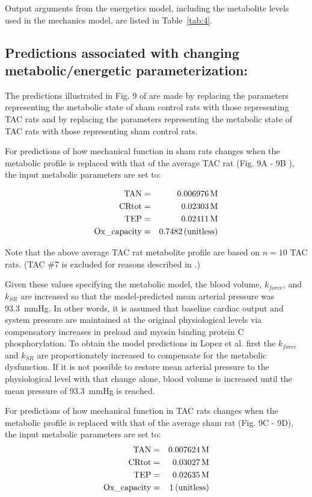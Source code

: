 \documentclass[fleqn,10pt]{physiome}
\begin{document}
Output arguments from the energetics model, including the metabolite levels used in the mechanics model, are listed in Table~\ref{tab:4}.

\subsection{Predictions associated with changing metabolic/energetic parameterization:}

The predictions illustrated in Fig. 9 of \cite{Lopez2020} are made by replacing the parameters representing the metabolic state of sham control rats with those representing TAC rats and by replacing the parameters representing the metabolic state of TAC rats with those representing sham control rats. 

For predictions of how mechanical function in sham rats changes when the metabolic profile is replaced with that of the average TAC rat (Fig. 9A - 9B \cite{Lopez2020}), the input metabolic parameters are set to:

\begin{eqnarray}
  {\rm TAN}   &=& 0.006976 \,  {\rm M} \nonumber \\
  {\rm CRtot} &=& 0.02303 \,  {\rm M} \nonumber \\
  {\rm TEP}   &=& 0.02411 \,  {\rm M} \nonumber \\
  {\rm Ox\_capacity} &=& 0.7482 \,  {\rm (unitless)} \nonumber
\end{eqnarray}

Note that the above average TAC rat metabolite profile are based on $n = 10$ TAC rats. (TAC \#7 is excluded for reasons described in \cite{Lopez2020}.)

Given these values specifying the metabolic model, the blood volume, $k_{force}$, and $k_{SR}$ are increased so that the model-predicted mean arterial pressure was 93.3~mmHg. In other words, it is assumed that baseline cardiac output and system pressure are maintained at the original physiological levels via compensatory increases in preload and myosin binding protein C phosphorylation. To obtain the model predictions in Lopez et al. first the $k_{force}$ and $k_{SR}$ are proportionately increased to compensate for the metabolic dysfunction. If it is not possible to restore mean arterial pressure to the physiological level with that change alone, blood volume is increased until the mean pressure of 93.3~mmHg is reached.

For predictions of how mechanical function in TAC rats changes when the metabolic profile is replaced with that of the average sham rat (Fig. 9C - 9D), the input metabolic parameters are set to:
\begin{eqnarray}
  {\rm TAN}   &=& 0.007624 \,  {\rm M} \nonumber \\
  {\rm CRtot} &=& 0.03027 \, {\rm M} \nonumber \\ 
  {\rm TEP}   &=& 0.02635 \, {\rm M} \nonumber \\
  {\rm Ox\_capacity} &=& 1 \, {\rm (unitless)} \nonumber
\end{eqnarray}
\end{document}
